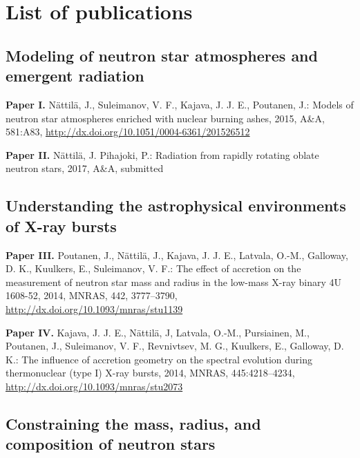 \chapter*{List of publications}


\vspace{-0.3cm}
\section*{Modeling of neutron star atmospheres and emergent radiation}

\hspace{15pt}\textbf{Paper I.} Nättilä, J., Suleimanov, V. F., Kajava, J. J. E., Poutanen, J.: Models of neutron star atmospheres enriched with nuclear burning ashes, 2015, A\&A, 581:A83, \url{http://dx.doi.org/10.1051/0004-6361/201526512}

\vspace{0.3cm}
\textbf{Paper II.} Nättilä, J. Pihajoki, P.: Radiation from rapidly rotating oblate neutron stars, 2017, A\&A, submitted



\vspace{0.3cm}
\section*{Understanding the astrophysical environments of X-ray bursts}

\hspace{15pt}\textbf{Paper III.} Poutanen, J., Nättilä, J., Kajava, J. J. E., Latvala, O.-M., Galloway, D. K., Kuulkers, E., Suleimanov, V. F.: The effect of accretion on the measurement of neutron star mass and radius in the low-mass X-ray binary 4U 1608-52, 2014, MNRAS, 442, 3777–3790, \url{http://dx.doi.org/10.1093/mnras/stu1139}

\vspace{0.3cm}
\textbf{Paper IV.} Kajava, J. J. E., Nättilä, J, Latvala, O.-M., Pursiainen, M., Poutanen, J., Suleimanov, V. F., Revnivtsev, M. G., Kuulkers, E., Galloway, D. K.: The influence of accretion geometry on the spectral evolution during thermonuclear (type I) X-ray bursts, 2014, MNRAS, 445:4218–4234, \url{http://dx.doi.org/10.1093/mnras/stu2073}



\vspace{0.3cm}
\section*{Constraining the mass, radius, and composition of neutron stars}

